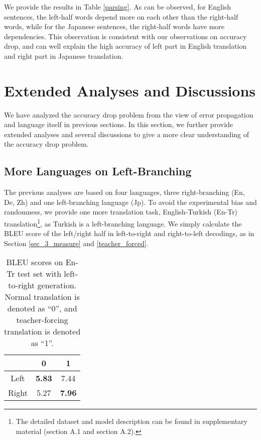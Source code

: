 \documentclass[11pt,a4paper]{article}
\begin{document}
We provide the results in Table \ref{parsing}. As can be observed, for English sentences, the left-half words depend more on each other than the right-half words, while for the Japanese sentences, the right-half words have more dependencies. This observation is consistent with our observations on accuracy drop, and can well explain the high accuracy of left part in English translation and right part in Japanese translation.

\section{Extended Analyses and Discussions}
\label{extended_analysis}
We have analyzed the accuracy drop problem from the view of error propagation and language itself in previous sections. In this section, we further provide extended analyses and several discussions to give a more clear understanding of the accuracy drop problem.

\subsection{More Languages on Left-Branching}
The previous analyses are based on four languages, three right-branching (En, De, Zh) and one left-branching language (Jp). To avoid the experimental bias and randomness, we provide one more translation task, English-Turkish (En-Tr) translation\footnote{The detailed dataset and model description can be found in supplementary material (section A.1 and section A.2).}, as Turkish is a  left-branching language. We simply calculate the BLEU score of the left/right half in left-to-right and right-to-left decodings, as in Section \ref{sec_3_measure} and \ref{teacher_forced}.

\begin{table}[tbp]
\small
\centering %
\begin{tabular}{ c  c  c } %
\toprule %
  & 0 & 1 \\
\midrule
Left & \textbf{5.83} & 7.44   \\
Right  & 5.27 & \textbf{7.96}  \\
\bottomrule
\end{tabular}
\caption{BLEU scores on En-Tr test set with left-to-right generation. Normal translation is denoted as ``0'', and teacher-forcing translation is denoted as ``1''.}
\label{En-Tr}
\end{table}
\end{document}
